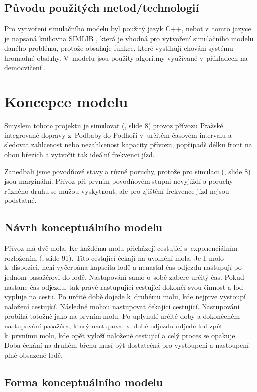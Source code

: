 \documentclass[11pt,a4paper]{article}
\begin{document}
  \subsection{Původu použitých metod/technologií}
  Pro vytvoření simulačního modelu byl použitý jazyk C++, neboť v~tomto jazyce je napsaná knihovna SIMLIB \cite{SIMLIB},
  která je vhodná pro vytvoření simulačního modelu daného problému, protože obsahuje funkce, které vystihují
  chování systému hromadné obsluhy. V~modelu jsou použity algoritmy využívané v~příkladech na democvičení \cite{DEMOCVIKO}.

  \section{Koncepce modelu}
  Smyslem tohoto projektu je simulovat (\cite{SLAJD}, slide 8) provoz přívozu Pražské integrované dopravy
  z~Podbaby do Podhoří v~určitém časovém intervalu a sledovat zahlcenost nebo nezahlcenost kapacity přívozu,
  popřípadě délku front na obou březích a vytvořit tak ideální frekvenci jízd.

  Zanedbali jsme povodňové stavy a různé poruchy, protože pro simulaci (\cite{SLAJD}, slide 8)
  jsou marginální. Přívoz při prvním povodňovém stupni nevyjíždí a poruchy různého druhu se
  můžou vyskytnout, ale pro zjištění frekvence jízd nejsou podstatné.

  \subsection{Návrh konceptuálního modelu}
  Přívoz má dvě mola. Ke každému molu přicházejí cestující s~exponenciálním rozložením (\cite{SLAJD}, slide 91).
  Tito cestující čekají na uvolnění mola. Je-li molo k~dispozici, není vyčerpána kapacita lodě a nenastal čas odjezdu
  nastupují po jednom pasažérovi do lodě. Nastupování samo o~sobě zabere určitý čas. Pokud nastane čas odjezdu, tak právě
  nastupující cestující dokončí svou činnost a loď vypluje na cestu. Po určité době dojede k~druhému molu, kde nejprve vystoupí naložení cestující.
  Následně mohou nastupovat čekající cestující. Nastupování probíhá totožně jako na prvním molu.
  Po uplynutí určité doby a dokončeném nastupování pasažéra, který nastupoval v~době odjezdu odjede loď zpět
k~prvnímu molu, kde opět vyloží naložené cestující a celý proces se opakuje. Doba čekání na druhém břehu musí být
  dostatečná pro vystoupení a nastoupení plně obsazené lodě.

  \subsection{Forma konceptuálního modelu}
\end{document}
